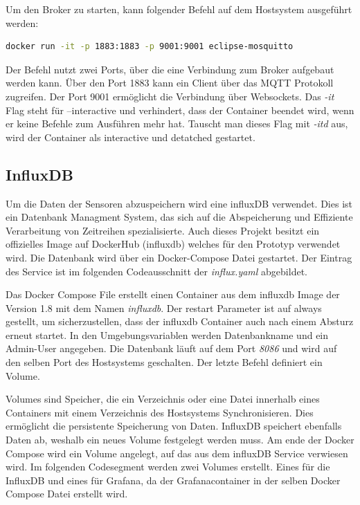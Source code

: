 \documentclass[a4paper, 12pt, oneside, toc=listofnumbered, bibliography=totoc]{scrbook}
\begin{document}
		Um den Broker zu starten, kann folgender Befehl auf dem Hostsystem ausgeführt werden:
		
		\begin{lstlisting}[numbers=none, language=bash, frame=single]
			docker run -it -p 1883:1883 -p 9001:9001 eclipse-mosquitto
		\end{lstlisting}
	
		Der Befehl nutzt zwei Ports, über die eine Verbindung zum Broker aufgebaut werden kann. Über den Port 1883 kann ein Client über das MQTT Protokoll zugreifen. Der Port 9001 ermöglicht die Verbindung über Websockets. Das \textit{-it} Flag steht für --interactive und verhindert, dass der Container beendet wird, wenn er keine Befehle zum Ausführen mehr hat. Tauscht man dieses Flag mit \textit{-itd} aus, wird der Container als interactive und detatched gestartet.
		
		
		\subsection{InfluxDB}
		
		Um die Daten der Sensoren abzuspeichern wird eine influxDB verwendet. Dies ist ein Datenbank Managment System, das sich auf die Abspeicherung und Effiziente Verarbeitung von Zeitreihen spezialisierte. Auch dieses Projekt besitzt ein offizielles Image auf DockerHub (influxdb) welches für den Prototyp verwendet wird. Die Datenbank wird über ein Docker-Compose Datei gestartet. Der Eintrag des Service ist im folgenden Codeausschnitt der \textit{influx.yaml} abgebildet.
		
		
		
		Das Docker Compose File erstellt einen Container aus dem influxdb Image der Version 1.8 mit dem Namen \textit{influxdb}. Der restart Parameter ist auf always gestellt, um sicherzustellen, dass der influxdb Container auch nach einem Absturz erneut startet. In den Umgebungsvariablen werden Datenbankname und ein Admin-User angegeben. Die Datenbank läuft auf dem Port \textit{8086} und wird auf den selben Port des Hostsystems geschalten. Der letzte Befehl definiert ein Volume. 
		
		Volumes sind Speicher, die ein Verzeichnis oder eine Datei innerhalb eines Containers mit einem Verzeichnis des Hostsystems Synchronisieren. Dies ermöglicht die persistente Speicherung von Daten. InfluxDB speichert ebenfalls Daten ab, weshalb ein neues Volume festgelegt werden muss. Am ende der Docker Compose wird ein Volume angelegt, auf das aus dem influxDB Service verwiesen wird. Im folgenden Codesegment werden zwei Volumes erstellt. Eines für die InfluxDB und eines für Grafana, da der Grafanacontainer in der selben Docker Compose Datei erstellt wird.
		
\end{document}
